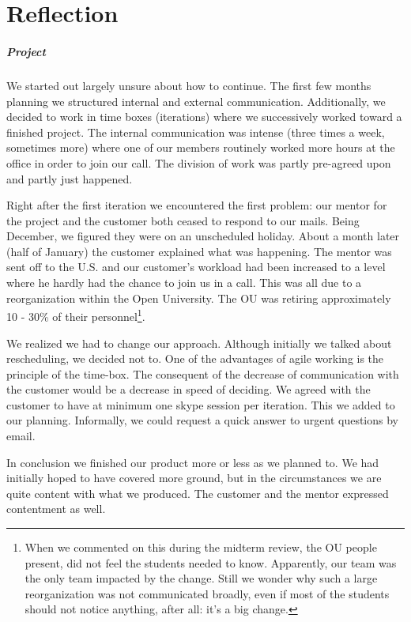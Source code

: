 \chapter{Reflection}
\paragraph{Project} We started out largely unsure about how to continue. The first few months
planning we structured internal and external communication. Additionally, we decided to 
work in time boxes (iterations) where we successively worked toward a finished project. 
The internal communication was intense (three times a week, sometimes more) where one of our
members routinely worked more hours at the office in order to join our call. The division of work 
was partly pre-agreed upon and partly just happened.

Right after the first iteration we encountered the first problem: our mentor for the project 
and the customer both ceased to respond to our mails. Being December, we figured they were 
on an unscheduled holiday. About a month later (half of January) the customer explained 
what was happening. The mentor was sent off to the U.S. and our customer's workload had been 
increased to a level where he hardly had the chance to join us in a call. This was all due to 
a reorganization within the Open University. The OU was retiring approximately 10 - 30\% of their
personnel\footnote{When we commented on this during the midterm review, the OU people present,
did not feel the students needed to know. Apparently, our team was the only team impacted 
by the change. Still we wonder why such a large reorganization was not communicated broadly, 
even if most of the students should not notice anything, after all: it's a big change.}.
 
We realized we had to change our approach. Although initially we talked about rescheduling,
we decided not to. One of the advantages of agile working is the principle of the time-box. 
The consequent of the decrease of communication with the customer would be a decrease in speed
of deciding. We agreed with the customer to have at minimum one skype session per iteration. 
This we added to our planning. Informally, we could request a quick answer to urgent questions
by email.

In conclusion we finished our product more or less as we planned to. We had initially
hoped to have covered more ground, but in the circumstances we are quite content with what 
we produced. The customer and the mentor expressed contentment as well.

